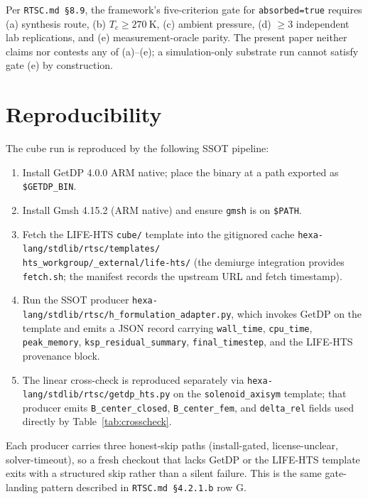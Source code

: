 \documentclass[11pt,a4paper]{article}
\newcommand{\absorbedtrue}{\textcolor{honestgreen}{\texttt{absorbed=true}}}
\begin{document}
Per \texttt{RTSC.md \S8.9}, the framework's five-criterion gate for
\absorbedtrue{} requires (a) synthesis route, (b) $T_c \geq 270~\mathrm{K}$,
(c) ambient pressure, (d) $\geq 3$ independent lab replications, and
(e) measurement-oracle parity. The present paper neither claims nor
contests any of (a)--(e); a simulation-only substrate run cannot
satisfy gate (e) by construction.

\section{Reproducibility}
\label{sec:repro}

The cube run is reproduced by the following SSOT pipeline:

\begin{enumerate}
\item Install GetDP 4.0.0 ARM native; place the binary at a path
exported as \texttt{\$GETDP\_BIN}.
\item Install Gmsh 4.15.2 (ARM native) and ensure
\texttt{gmsh} is on \texttt{\$PATH}.
\item Fetch the LIFE-HTS \texttt{cube/} template into the
gitignored cache \texttt{hexa-lang/stdlib/rtsc/templates/\\
hts\_workgroup/\_external/life-hts/} (the demiurge integration
provides \texttt{fetch.sh}; the manifest records the upstream URL
and fetch timestamp).
\item Run the SSOT producer
\texttt{hexa-lang/stdlib/rtsc/h\_formulation\_adapter.py}, which
invokes GetDP on the template and emits a JSON record carrying
\texttt{wall\_time}, \texttt{cpu\_time}, \texttt{peak\_memory},
\texttt{ksp\_residual\_summary}, \texttt{final\_timestep}, and
the LIFE-HTS provenance block.
\item The linear cross-check is reproduced separately via
\texttt{hexa-lang/stdlib/rtsc/getdp\_hts.py} on the
\texttt{solenoid\_axisym} template; that producer emits
\texttt{B\_center\_closed}, \texttt{B\_center\_fem}, and
\texttt{delta\_rel} fields used directly by
Table~\ref{tab:crosscheck}.
\end{enumerate}

Each producer carries three honest-skip paths (install-gated,
license-unclear, solver-timeout), so a fresh checkout that lacks
GetDP or the LIFE-HTS template exits with a structured skip rather
than a silent failure. This is the same gate-landing pattern
described in \texttt{RTSC.md \S4.2.1.b} row G.
\end{document}
